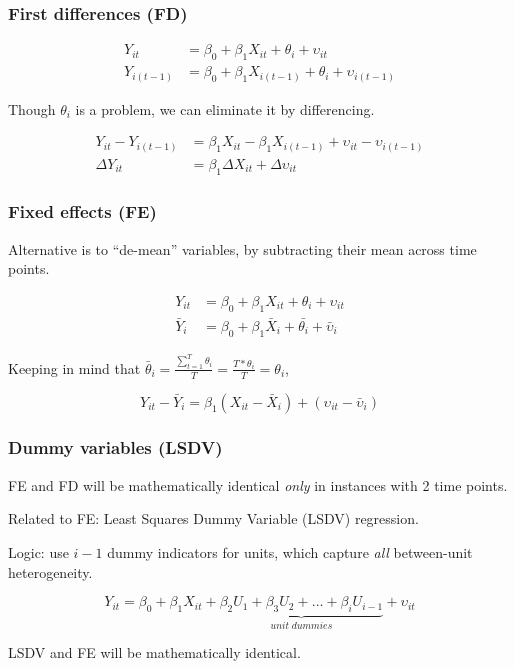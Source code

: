 \documentclass[11pt,english,dvipsnames,aspectratio=169,handout]{beamer}\usepackage[]{graphicx}\usepackage[]{xcolor}
\begin{document}
\begin{frame}
  \frametitle{First differences (FD)}
  
  \begin{align}
  Y_{it} &= \beta_0 + \beta_1X_{it} + \theta_i + \upsilon_{it} \\
  Y_{i(t-1)} &= \beta_0 + \beta_1X_{i(t-1)} + \theta_i + \upsilon_{i(t-1)}
\end{align}\pause

Though $\theta_i$ is a problem, we can eliminate it by differencing.

\begin{align}
  Y_{it} - Y_{i(t-1)} &=  \beta_1X_{it} - \beta_1X_{i(t-1)} + \upsilon_{it} - \upsilon_{i(t-1)} \\
  \Delta Y_{it} &= \beta_1\Delta X_{it} + \Delta\upsilon_{it}
\end{align}
  
\end{frame}


\begin{frame}
  \frametitle{Fixed effects (FE)}
  Alternative is to ``de-mean'' variables, by subtracting their mean across time points.
  
  \begin{align}
  Y_{it} &= \beta_0 + \beta_1X_{it} + \theta_i + \upsilon_{it} \\
  \bar{Y}_{i} &= \beta_0 + \beta_1\bar{X}_i + \bar{\theta_i} + \bar{\upsilon}_i
\end{align}\pause

  Keeping in mind that $\bar{\theta}_i = \frac{\sum_{t=1}^T\theta_i}{T} = \frac{T*\theta_i}{T} = \theta_i$,
  
\begin{equation}
  Y_{it} - \bar{Y}_i = \beta_1(X_{it} - \bar{X}_i) + (\upsilon_{it} - \bar{\upsilon}_i)
\end{equation}

\end{frame}


\begin{frame}
  \frametitle{Dummy variables (LSDV)}
  FE and FD will be mathematically identical \textit{only} in instances with 2 time points.\bigskip
  \pause
  
  Related to FE: Least Squares Dummy Variable (LSDV) regression.\bigskip
  \pause
  
  Logic: use $i-1$ dummy indicators for units, which capture \textit{all} between-unit heterogeneity.

\begin{equation}
  Y_{it} = \beta_0 + \beta_1X_{it} + \underbrace{\beta_2U_1 + \beta_3U_2 + \dots + \beta_iU_{i-1}}_{unit\; dummies} + \upsilon_{it}
\end{equation}\pause

LSDV and FE will be mathematically identical.

\end{frame}
\end{document}
